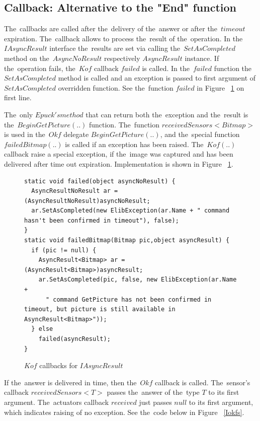   \subsection{Callback: Alternative to the "End" function} 
  The~callbacks are called after the~delivery of the~answer or after the~$timeout$ expiration.
  The~callback allows to process the~result of the~operation.
  In the~$IAsyncResult$ interface the~results are set via calling the~$SetAsCompleted$ method 
  on the~$AsyncNoResult$ respectively $AsyncResult$ instance.
  If the~operation fails, the~$Kof$ callback $failed$ is called. 
  In the~$failed$ function the~$SetAsCompleted$ method is called 
  and an exception is passed to first argument of $SetAsCompleted$ overridden function.
  See the~function $failed$ in Figure ~\ref{Ikofs} on first line.

  The~only $Epuck's method$ that can return both the~exception and the~result is the~$BeginGetPicture(..)$ function.
  The~function $receivedSensors<Bitmap>$ is used in the~$Okf$ delegate $BeginGetPicture(..)$, and 
  the~special function $failedBitmap(..)$ is called if an exception has been raised.
  The~$Kof(..)$ callback raise a special exception, if the~image was captured and has been 
  delivered after time out expiration.
  Implementation is shown in Figure ~\ref{Ikofs}. 

  
\begin{figure}[!hbp]
\begin{lstlisting}
static void failed(object asyncNoResult) {
  AsyncResultNoResult ar = (AsyncResultNoResult)asyncNoResult;
  ar.SetAsCompleted(new ElibException(ar.Name + " command hasn't been confirmed in timeout"), false); 
}
static void failedBitmap(Bitmap pic,object asyncResult) {
  if (pic != null) {
    AsyncResult<Bitmap> ar = (AsyncResult<Bitmap>)asyncResult;        
    ar.SetAsCompleted(pic, false, new ElibException(ar.Name + 
      " command GetPicture has not been confirmed in timeout, but picture is still available in AsyncResult<Bitmap>"));
  } else
    failed(asyncResult);
}
\end{lstlisting}	
\caption{$Kof$ callbacks for $IAsyncResult$} \label{Ikofs}
\end{figure}


  If the~answer is delivered in time, then the~$Okf$ callback is called.
  The~sensor's callback $receivedSensors<T>$ passes the~answer of the~type $T$ to its first argument.
  The~actuators callback $received$ just passes $null$ to its first argument, which indicates
  raising of no exception.
  See the~code below in Figure ~\ref{Iokfs}.


